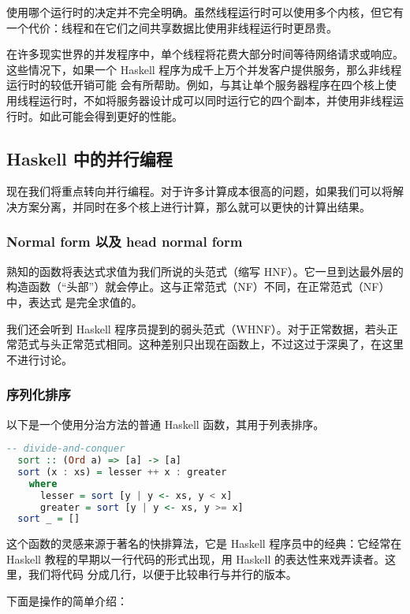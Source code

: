 \documentclass[./main.tex]{subfiles}
\begin{document}
使用哪个运行时的决定并不完全明确。虽然线程运行时可以使用多个内核，但它有一个代价：线程和在它们之间共享数据比使用非线程运行时更昂贵。

在许多现实世界的并发程序中，单个线程将花费大部分时间等待网络请求或响应。这些情况下，如果一个 Haskell 程序为成千上万个并发客户提供服务，那么非线程运行时的较低开销可能
会有所帮助。例如，与其让单个服务器程序在四个核上使用线程运行时，不如将服务器设计成可以同时运行它的四个副本，并使用非线程运行时。如此可能会得到更好的性能。

\subsection*{Haskell 中的并行编程}

现在我们将重点转向并行编程。对于许多计算成本很高的问题，如果我们可以将解决方案分离，并同时在多个核上进行计算，那么就可以更快的计算出结果。

\subsubsection*{Normal form 以及 head normal form}

熟知的函数将表达式求值为我们所说的头范式（缩写 HNF）。它一旦到达最外层的构造函数（“头部”）就会停止。这与正常范式（NF）不同，在正常范式（NF）中，表达式
是完全求值的。

我们还会听到 Haskell 程序员提到的弱头范式（WHNF）。对于正常数据，若头正常范式与头正常范式相同。这种差别只出现在函数上，不过这过于深奥了，在这里不进行讨论。

\subsubsection*{序列化排序}

以下是一个使用分治方法的普通 Haskell 函数，其用于列表排序。

\begin{lstlisting}[language=Haskell]
  -- divide-and-conquer
  sort :: (Ord a) => [a] -> [a]
  sort (x : xs) = lesser ++ x : greater
    where
      lesser = sort [y | y <- xs, y < x]
      greater = sort [y | y <- xs, y >= x]
  sort _ = []
\end{lstlisting}

这个函数的灵感来源于著名的快排算法，它是 Haskell 程序员中的经典：它经常在 Haskell 教程的早期以一行代码的形式出现，用 Haskell 的表达性来戏弄读者。这里，我们将代码
分成几行，以便于比较串行与并行的版本。

下面是操作的简单介绍：
\end{document}
